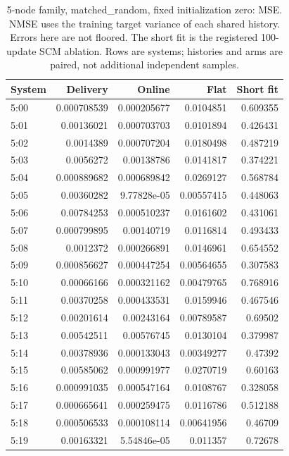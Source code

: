 \begin{table}[ht]
\centering\scriptsize
\begin{tabular}{lrrrr}
\toprule
System & Delivery & Online & Flat & Short fit\\
\midrule
5:00 & 0.000708539 & 0.000205677 & 0.0104851 & 0.609355\\
5:01 & 0.00136021 & 0.000703703 & 0.0101894 & 0.426431\\
5:02 & 0.0014389 & 0.000707204 & 0.0180498 & 0.487219\\
5:03 & 0.0056272 & 0.00138786 & 0.0141817 & 0.374221\\
5:04 & 0.000889682 & 0.000689842 & 0.0269127 & 0.568784\\
5:05 & 0.00360282 & 9.77828e-05 & 0.00557415 & 0.448063\\
5:06 & 0.00784253 & 0.000510237 & 0.0161602 & 0.431061\\
5:07 & 0.000799895 & 0.00140719 & 0.0116814 & 0.493433\\
5:08 & 0.0012372 & 0.000266891 & 0.0146961 & 0.654552\\
5:09 & 0.000856627 & 0.000447254 & 0.00564655 & 0.307583\\
5:10 & 0.00066166 & 0.000321162 & 0.00479765 & 0.768916\\
5:11 & 0.00370258 & 0.000433531 & 0.0159946 & 0.467546\\
5:12 & 0.00201614 & 0.00243164 & 0.00789587 & 0.69502\\
5:13 & 0.00542511 & 0.00576745 & 0.0130104 & 0.379987\\
5:14 & 0.00378936 & 0.000133043 & 0.00349277 & 0.47392\\
5:15 & 0.00585062 & 0.000991977 & 0.0270719 & 0.60163\\
5:16 & 0.000991035 & 0.000547164 & 0.0108767 & 0.328058\\
5:17 & 0.000665641 & 0.000259475 & 0.0116786 & 0.512188\\
5:18 & 0.000506533 & 0.000108114 & 0.00641956 & 0.46709\\
5:19 & 0.00163321 & 5.54846e-05 & 0.011357 & 0.72678\\
\bottomrule
\end{tabular}
\caption{5-node family, matched\_random, fixed initialization zero: MSE. NMSE uses the training target variance of each shared history. Errors here are not floored. The short fit is the registered 100-update SCM ablation. Rows are systems; histories and arms are paired, not additional independent samples.}
\end{table}
